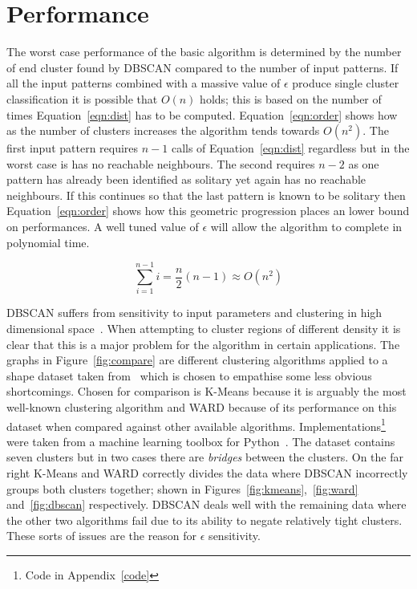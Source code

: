\documentclass{ecsarticle}     %
\begin{document}
\section{Performance}
\label{performance}

The worst case performance of the basic algorithm is determined by the number of end cluster found by DBSCAN compared to the number of input patterns.
If all the input patterns combined with a massive value of $\epsilon$ produce single cluster classification it is possible that $O(n)$ holds; this is based on the number of times Equation~\eqref{eqn:dist} has to be computed.
Equation~\eqref{eqn:order} shows how as the number of clusters increases the algorithm tends towards $O(n^2)$.
The first input pattern requires $n-1$ calls of Equation~\eqref{eqn:dist} regardless but in the worst case is has no reachable neighbours.
The second requires $n-2$ as one pattern has already been identified as solitary yet again has no reachable neighbours.
If this continues so that the last pattern is known to be solitary then Equation~\eqref{eqn:order} shows how this geometric progression places an lower bound on performances.
A well tuned value of $\epsilon$ will allow the algorithm to complete in polynomial time.

\begin{equation}
	\sum\limits_{i=1}^{n-1} i = \frac{n}{2}(n - 1) \approx O(n^2)	
	\label{eqn:order}
\end{equation}


DBSCAN suffers from sensitivity to input parameters and clustering in high dimensional space~\cite{han01survey}.
When attempting to cluster regions of different density it is clear that this is a major problem for the algorithm in certain applications. 
The graphs in Figure~\ref{fig:compare} are different clustering algorithms applied to a shape dataset taken from~\cite{gionis05cluster} which is chosen to empathise some less obvious shortcomings.
Chosen for comparison is K-Means because it is arguably the most well-known clustering algorithm and WARD because of its performance on this dataset when compared against other available algorithms.
Implementations\footnote{Code in Appendix~\ref{code}} were taken from a machine learning toolbox for Python~\citep{scikit13ml}.
The dataset contains seven clusters but in two cases there are \emph{bridges} between the clusters.
On the far right K-Means and WARD correctly divides the data where DBSCAN incorrectly groups both clusters together; shown in Figures~\ref{fig:kmeans},~\ref{fig:ward} and~\ref{fig:dbscan} respectively.
DBSCAN deals well with the remaining data where the other two algorithms fail due to its ability to negate relatively tight clusters.
These sorts of issues are the reason for $\epsilon$ sensitivity. 
\end{document}
